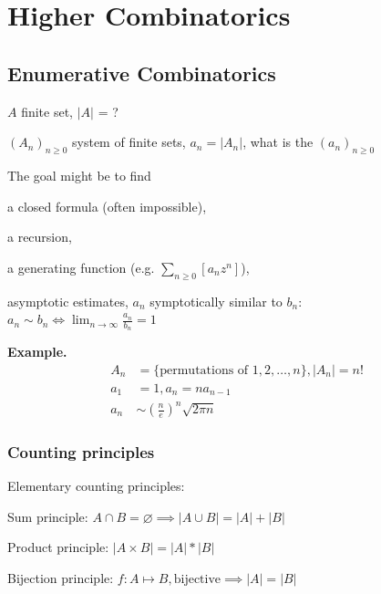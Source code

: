 

\chapter{Higher Combinatorics}

\section{Enumerative Combinatorics}

\strut{}
$A$ finite set, $|A|$ = ?

$(A_n)_{n ≥ 0}$ system of finite sets, $a_n = |A_n|$, what is the  $(a_n)_{n ≥ 0}$

The goal might be to find
\begin{compactitem}
  \item a closed formula (often impossible),
  \item a recursion,
  \item a generating function (e.g. $\sum_{n \geq 0}[a_n z^n]$),
  \item asymptotic estimates, $a_n$ symptotically similar to $b_n$:\\
    $a_n \sim b_n \iff \lim_{n \to \infty} \frac{a_n}{b_n} = 1$
\end{compactitem}


\textbf{Example.}
\begin{align*}
  A_n &= \{\text{permutations of } 1,2, \ldots, n\}, |A_n| = n! \\
  a_1 &= 1, a_n = n a_{n-1} \\
  a_n &\sim \left(\frac{n}{e} \right)^n \sqrt{2\pi n}
\end{align*}


\subsection{Counting principles}

Elementary counting principles:
\begin{compactenum}
  \item Sum principle:
    $A\cap B = \varnothing \implies |A\cup B| = |A| + |B|$
  \item Product principle:
    $|A\times B| = |A| * |B|$
  \item Bijection principle:
    $f: A\mapsto B, \text{bijective}\implies |A| = |B|$
\end{compactenum}

